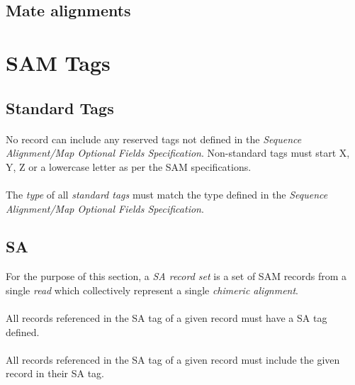 \documentclass[10pt]{article}
\begin{document}
\subsection{Mate alignments}

\section{SAM Tags}

\subsection{Standard Tags}

\paragraph{}

No record can include any reserved tags not defined in the
{\sl Sequence Alignment/Map Optional Fields Specification}.
Non-standard tags must start X, Y, Z or a lowercase letter as per the SAM specifications.

\paragraph{}

The \textit{type} of all \textit{standard tags} must match the type
defined in the {\sl Sequence Alignment/Map Optional Fields Specification}.

\subsection{SA}

For the purpose of this section, a \textit{SA record set} is a set of SAM records
from a single \textit{read} which collectively represent a single \textit{chimeric alignment}.

\paragraph{}

All records referenced in the SA tag of a given record must have a SA tag defined.

\paragraph{}

All records referenced in the SA tag of a given record must include the given
record in their SA tag.
\end{document}
